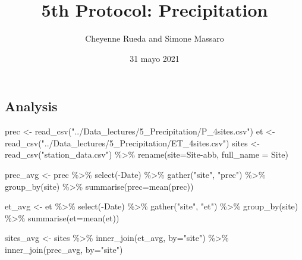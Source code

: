 \documentclass[
]{article}
\title{5th Protocol: Precipitation}
\author{Cheyenne Rueda and Simone Massaro}
\date{31 mayo 2021}
\newenvironment{Shaded}{\begin{snugshade}}{\end{snugshade}}
\newcommand{\AttributeTok}[1]{\textcolor[rgb]{0.77,0.63,0.00}{#1}}
\newcommand{\FunctionTok}[1]{\textcolor[rgb]{0.00,0.00,0.00}{#1}}
\newcommand{\NormalTok}[1]{#1}
\newcommand{\OtherTok}[1]{\textcolor[rgb]{0.56,0.35,0.01}{#1}}
\newcommand{\SpecialCharTok}[1]{\textcolor[rgb]{0.00,0.00,0.00}{#1}}
\newcommand{\StringTok}[1]{\textcolor[rgb]{0.31,0.60,0.02}{#1}}
\begin{document}
\maketitle

{
\setcounter{tocdepth}{2}
\tableofcontents
}
\hypertarget{analysis}{%
\subsection{Analysis}\label{analysis}}

\begin{Shaded}
\begin{Highlighting}[]
\NormalTok{prec }\OtherTok{\textless{}{-}} \FunctionTok{read\_csv}\NormalTok{(}\StringTok{"../Data\_lectures/5\_Precipitation/P\_4sites.csv"}\NormalTok{)}
\NormalTok{et }\OtherTok{\textless{}{-}} \FunctionTok{read\_csv}\NormalTok{(}\StringTok{"../Data\_lectures/5\_Precipitation/ET\_4sites.csv"}\NormalTok{)}
\NormalTok{sites }\OtherTok{\textless{}{-}} \FunctionTok{read\_csv}\NormalTok{(}\StringTok{"station\_data.csv"}\NormalTok{) }\SpecialCharTok{\%\textgreater{}\%}
  \FunctionTok{rename}\NormalTok{(}\AttributeTok{site=}\StringTok{\textasciigrave{}}\AttributeTok{Site{-}abb}\StringTok{\textasciigrave{}}\NormalTok{, }\AttributeTok{full\_name =}\NormalTok{ Site)}
\end{Highlighting}
\end{Shaded}

\begin{Shaded}
\begin{Highlighting}[]
\NormalTok{prec\_avg }\OtherTok{\textless{}{-}}\NormalTok{ prec }\SpecialCharTok{\%\textgreater{}\%}
  \FunctionTok{select}\NormalTok{(}\SpecialCharTok{{-}}\NormalTok{Date) }\SpecialCharTok{\%\textgreater{}\%}
  \FunctionTok{gather}\NormalTok{(}\StringTok{"site"}\NormalTok{, }\StringTok{"prec"}\NormalTok{) }\SpecialCharTok{\%\textgreater{}\%}
    \FunctionTok{group\_by}\NormalTok{(site) }\SpecialCharTok{\%\textgreater{}\%}
  \FunctionTok{summarise}\NormalTok{(}\AttributeTok{prec=}\FunctionTok{mean}\NormalTok{(prec))}

\NormalTok{et\_avg }\OtherTok{\textless{}{-}}\NormalTok{ et }\SpecialCharTok{\%\textgreater{}\%}
  \FunctionTok{select}\NormalTok{(}\SpecialCharTok{{-}}\NormalTok{Date) }\SpecialCharTok{\%\textgreater{}\%}
  \FunctionTok{gather}\NormalTok{(}\StringTok{"site"}\NormalTok{, }\StringTok{"et"}\NormalTok{) }\SpecialCharTok{\%\textgreater{}\%}
    \FunctionTok{group\_by}\NormalTok{(site) }\SpecialCharTok{\%\textgreater{}\%}
  \FunctionTok{summarise}\NormalTok{(}\AttributeTok{et=}\FunctionTok{mean}\NormalTok{(et))}

\NormalTok{sites\_avg }\OtherTok{\textless{}{-}}\NormalTok{ sites }\SpecialCharTok{\%\textgreater{}\%}
  \FunctionTok{inner\_join}\NormalTok{(et\_avg, }\AttributeTok{by=}\StringTok{"site"}\NormalTok{) }\SpecialCharTok{\%\textgreater{}\%}
  \FunctionTok{inner\_join}\NormalTok{(prec\_avg, }\AttributeTok{by=}\StringTok{"site"}\NormalTok{)}
\end{Highlighting}
\end{Shaded}
\end{document}
